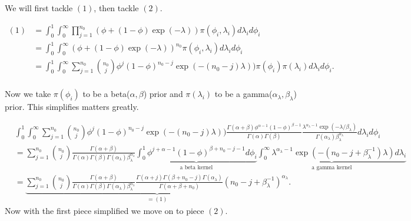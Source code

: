 \documentclass{article}
\begin{document}
We will first tackle $(1)$, then tackle $(2)$. 

\begin{align*}
(1)&= \int_0^1\int_0^\infty\prod_{j=1}^{n_0}(\phi + (1-\phi)\exp{(-\lambda)})\pi(\phi_i,\lambda_i )d\lambda_id\phi_i \\
&= \int_0^1\int_0^\infty(\phi + (1-\phi)\exp{(-\lambda)})^{n_0}\pi(\phi_i,\lambda_i )d\lambda_id\phi_i \\
&= \int_0^1\int_0^\infty\sum_{j=1}^{n_0}{n_0\choose j}\phi^{j}(1-\phi)^{n_0-j}\exp{(-(n_0-j)\lambda)})\pi(\phi_i)\pi(\lambda_i )d\lambda_id\phi_i. \\
\end{align*}
 
 Now we take $\pi(\phi_i)$ to be a beta($\alpha, \beta$) prior and $\pi(\lambda_i)$ to be a gamma($\alpha_{\lambda}, \beta_{\lambda}$) prior. This simplifies matters greatly. 
 
 \begin{align*}
 & \int_0^1\int_0^\infty\sum_{j=1}^{n_0}{n_0\choose j}\phi^{j}(1-\phi)^{n_0-j}\exp{(-(n_0-j)\lambda)})\frac{\Gamma(\alpha+\beta)\phi^{\alpha-1}(1-\phi)^{\beta-1}}{\Gamma(\alpha)\Gamma(\beta)}\frac{\lambda^{\alpha_{\lambda}-1}\exp{(-\lambda/\beta_{\lambda})}}{\Gamma(\alpha_{\lambda})\beta_{\lambda}^{\alpha_{\lambda}}} d\lambda_id\phi_i \\
&=\sum_{j=1}^{n_0}{n_0\choose j}\frac{\Gamma(\alpha+\beta)}{\Gamma(\alpha)\Gamma(\beta)\Gamma(\alpha_{\lambda})\beta_{\lambda}^{\alpha_{\lambda}}} \underbrace{\int_0^1\phi^{j+\alpha-1}(1-\phi)^{\beta+n_0-j-1}d\phi_i}_{\text{a beta kernel}}  \underbrace{\int_0^\infty \lambda^{\alpha_{\lambda}-1} \exp{(-(n_0-j+\beta_{\lambda}^{-1})\lambda)} d\lambda_i}_{\text{a gamma kernel}}\\
&=\underbrace{\sum_{j=1}^{n_0}{n_0\choose j}\frac{\Gamma(\alpha+\beta)}{\Gamma(\alpha)\Gamma(\beta)\Gamma(\alpha_{\lambda})\beta_{\lambda}^{\alpha_{\lambda}}} \frac{\Gamma(\alpha+j)\Gamma(\beta+n_0-j)\Gamma(\alpha_{\lambda})}{\Gamma(\alpha+\beta+n_0)}(n_0-j+\beta_{\lambda}^{-1})^{\alpha_{\lambda}}}_{=(1)}.
\end{align*} 
Now with the first piece simplified we move on to piece $(2)$. 
 
\end{document}

